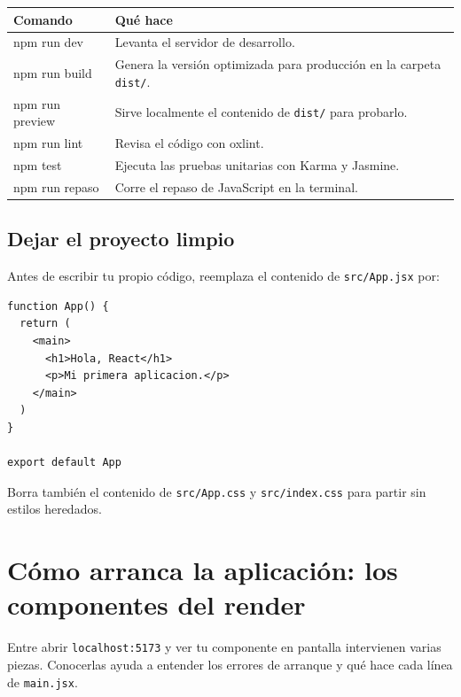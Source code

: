 \documentclass[11pt,a4paper]{article}
\newcommand{\cmd}[1]{\texttt{\color{reactdark}#1}}
\begin{document}
\begin{center}
\begin{tabular}{>{\ttfamily}l p{9.5cm}}
\toprule
\textrm{\textbf{Comando}} & \textbf{Qué hace} \\
\midrule
npm run dev & Levanta el servidor de desarrollo. \\
npm run build & Genera la versión optimizada para producción en la carpeta \cmd{dist/}. \\
npm run preview & Sirve localmente el contenido de \cmd{dist/} para probarlo. \\
npm run lint & Revisa el código con oxlint. \\
npm test & Ejecuta las pruebas unitarias con Karma y Jasmine. \\
npm run repaso & Corre el repaso de JavaScript en la terminal. \\
\bottomrule
\end{tabular}
\end{center}

\subsection{Dejar el proyecto limpio}

Antes de escribir tu propio código, reemplaza el contenido de \cmd{src/App.jsx} por:
\begin{lstlisting}[language=JSX,title={\small\ttfamily src/App.jsx}]
function App() {
  return (
    <main>
      <h1>Hola, React</h1>
      <p>Mi primera aplicacion.</p>
    </main>
  )
}

export default App
\end{lstlisting}

Borra también el contenido de \cmd{src/App.css} y \cmd{src/index.css} para partir sin estilos heredados.

\section{Cómo arranca la aplicación: los componentes del render}\label{sec:arranque}

Entre abrir \cmd{localhost:5173} y ver tu componente en pantalla intervienen varias piezas. Conocerlas ayuda a entender los errores de arranque y qué hace cada línea de \cmd{main.jsx}.
\end{document}

